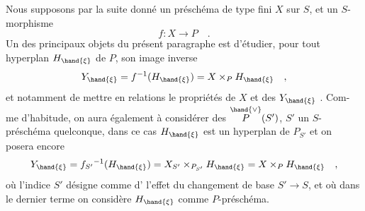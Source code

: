 Nous supposons par la suite donné un préschéma de type fini $X$ sur $S$,
et un $S$-morphisme
\[ f\colon X\longrightarrow P \quad . \]
Un des principaux objets\hand{,} du présent paragraphe est d'étudier, pour tout
hyperplan $H_{\hand{\xi}}$ de $P$,  son image inverse
\[ Y_{\hand{\xi}} = f^{-1}(H_{\hand{\xi}}) = X\times_P H_{\hand{\xi}} \quad , \]
et notamment de mettre en relations le propriétés de $X$ et des $Y_{\hand{\xi}}$ . Com-%
me d'habitude, on aura également à considérer des $\overset{\hand{\vee}}{P}(S')$, $S'$ 
un $S$-préschéma quelconque, dans ce cas $H_{\hand{\xi}}$ est un hyperplan de $P_{S'}$ \hand{,}
et on posera encore
\[ Y_{\hand{\xi}} = f_{S'}{}^{-1}(H_{\hand{\xi}}) = X_{S'}\times_{P_{S'}}H_{\hand{\xi}} = X\times_P H_{\hand{\xi}} \quad , \]
où l'indice $S'$ désigne comme d'  l'effet du changement de base
$S'\longrightarrow S$, et où dans le dernier terme on considère $H_{\hand{\xi}}$ comme $P$-préschéma.

